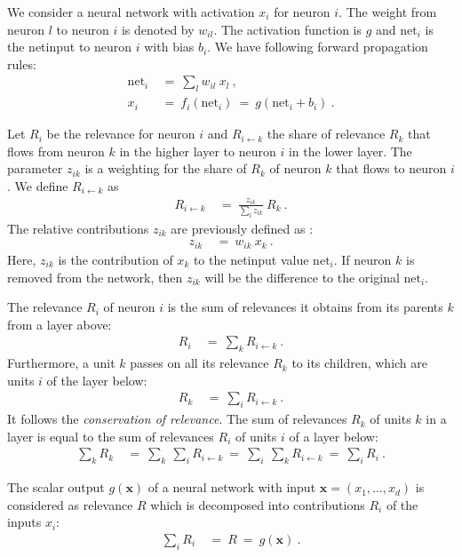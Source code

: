 \documentclass{article}
\newcommand\Bx{\bm{x}}
\newcommand\net{\mathrm{net}}
\begin{document}
\begin{appendices}
We consider a neural network with activation $x_i$ for neuron $i$.
The weight from neuron $l$ to neuron $i$ is denoted by $w_{il}$.
The activation function is $g$ and $\net_i$ is the netinput to
neuron $i$ with bias $b_i$.
We have following forward propagation rules:
\begin{align}
  \net_i \ &= \ \sum_l w_{il} \ x_l \ , \\
  x_i \ &= \ f_i(\net_i)  \ = \ g( \net_i + b_i) \ .
\end{align} 


Let $R_i$ be the relevance for neuron $i$ and $R_{i \leftarrow k}$
the share of relevance $R_k$ that flows from neuron $k$ in the higher
layer to neuron $i$ in the lower layer.
The parameter $z_{ik}$ is a weighting for the share of $R_k$ of neuron
$k$ that flows to neuron $i$. We define $R_{i \leftarrow k}$ as
\begin{align}
    R_{i \leftarrow k}\ &= \  \frac{z_{ik}}{\sum_l z_{lk}} \ R_k \ .
\end{align}
The relative contributions $z_{ik}$ are
previously defined as \cite{Bach:15,Montavon:17,Arras:17}:
\begin{align}
  z_{ik}\ &= \ w_{ik} \ x_k \ .
\end{align}
Here, $z_{ik}$ is the contribution of $x_k$ to the netinput value $\net_i$.
If neuron $k$ is removed from the network,
then  $z_{ik}$ will be the difference to the original $\net_i$.



The relevance $R_i$ of neuron $i$ is the sum of relevances it obtains
from its parents $k$ from a layer above: 
\begin{align}
   R_{i}\ &= \ \sum_k R_{i \leftarrow k} \ . 
\end{align}
Furthermore, a unit $k$ passes on all its relevance $R_k$ to its children,
which are units $i$ of the layer below:
\begin{align}
   R_k \ &= \  \sum_i  R_{i \leftarrow k} \ .
\end{align}
It follows the {\em conservation of relevance}.
The sum of relevances $R_k$
of units $k$ in a layer is equal to the sum of
relevances $R_i$ of units $i$
of a layer below:
\begin{align}
  \label{eq:cons}
  \sum_k R_k \ &= \  \sum_k  \ \sum_i  R_{i \leftarrow k} \ = \
  \sum_i  \ \sum_k  R_{i \leftarrow k}  \ = \ \sum_i R_i \ .
\end{align} 


The scalar output $g(\Bx)$ 
of a neural network with input $\Bx=(x_1,\ldots,x_d)$
is considered as relevance $R$ which is
decomposed into contributions $R_i$ of the inputs $x_i$:
\begin{align}
  \sum_i R_i \ &= \  R \ = \ g(\Bx) \ .
\end{align} 


\end{appendices}
\end{document}
